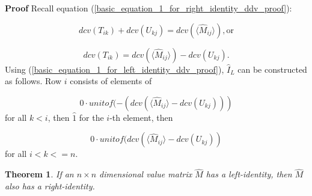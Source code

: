\documentclass[10pt,letterpaper]{article}
\newtheorem{thm}{Theorem}[section]
\newenvironment{proof}{\noindent\textbf{Proof} }{\qed \newline}
\newcommand{\qed}{\nobreak \ifvmode \relax \else
      \ifdim\lastskip<1.5em \hskip-\lastskip
      \hskip1.5em plus0em minus0.5em \fi \nobreak
      \vrule height0.75em width0.5em depth0.25em\fi}
\numberwithin{equation}{section}
\begin{document}
\begin{proof} Recall equation
  (\ref{basic_equation_1_for_right_identity_ddv_proof}):

  \[ dcv(T_{ik}) + dcv(U_{kj}) = dcv( \langle \hat M_{ij} \rangle ) ,
  \mbox{or} \]

  \begin{equation} dcv(T_{ik}) = dcv( \langle \hat M_{ij} \rangle ) -
    dcv(U_{kj}) . \end{equation} Using
  (\ref{basic_equation_1_for_left_identity_ddv_proof}), $\hat I_L$ can
  be constructed as follows.  Row $i$ consists of elements of

  \[ 0 \cdot unitof( -(dcv( \langle \hat M_{ij} \rangle -
  dcv(U_{kj}))) \] for all $k < i$, then $\hat 1$ for the $i$-th
  element, then

  \[ 0 \cdot unitof( dcv( \langle \hat M_{ij} \rangle -
  dcv(U_{kj})) \] for all $i < k <= n$. \end{proof}

\begin{thm}If an $n \times n$ dimensional value matrix $\hat M$  has a
  left-identity, then $\hat M$ also has a right-identity.\end{thm}
\end{document}
